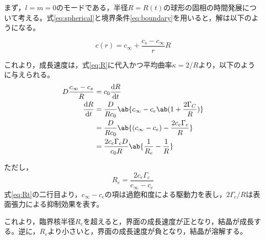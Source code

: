 \documentclass[autodetect-engine,dvi=dvipdfmx,a4paper,ja=standard,oneside,openany,11pt,draft]{bxjsbook}
\begin{document}
まず，$l=m=0$のモードである，半径$R=R(t)$の球形の固相の時間発展について考える。式\eqref{eq:spherical}と境界条件\eqref{eq:boundary}を用いると，解は以下のようになる。

\begin{equation}
  c(r) = c_{\infty} + \frac{c_s-c_{\infty}}{r}R
  \label{eq:sphere}
\end{equation}

これより，成長速度は，式\eqref{eq:R}に代入かつ平均曲率$\kappa=2/R$より，以下のように与えられる。
\begin{equation}
  \begin{split}
    D\frac{c_\infty-c_s}{R} & =c_0\odv{R}{t}                                                 \\
    \odv{R}{t}              & = \frac{D}{Rc_0}\ab\{c_\infty-c_e\ab(1+\frac{2\Gamma_C}{R})\}  \\
                            & = \frac{D}{R c_0}\ab\{(c_\infty-c_e)-\frac{2c_e\Gamma_c}{R}\}  \\
                            & = \frac{2c_e\Gamma_c D}{c_0 R}\ab\{\frac{1}{R_e}-\frac{1}{R}\}
  \end{split}
  \label{eq:Rt}
\end{equation}

ただし，
\begin{equation}
  R_e = \frac{2c_e \Gamma_c }{c_\infty-c_e}
  \label{eq:Re}
\end{equation}
式\eqref{eq:Rt}の二行目より，$c_\infty-c_e$の項は過飽和度による駆動力を表し，$2\Gamma_c/R$は表面張力による抑制効果を表す。

これより，臨界核半径$R_e$を超えると，界面の成長速度が正となり，結晶が成長する。逆に，$R_e$より小さいと，界面の成長速度が負となり，結晶が溶解する。
\end{document}
